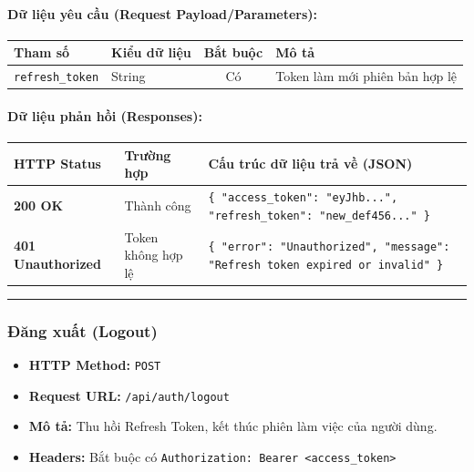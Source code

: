 \documentclass[12pt,a4paper]{article}
\begin{document}
\paragraph{Dữ liệu yêu cầu (Request Payload/Parameters):}
\begin{longtable}{|>{\raggedright\arraybackslash}p{2.8cm}|>{\raggedright\arraybackslash}p{2.2cm}|c|>{\raggedright\arraybackslash}p{7.0cm}|}
\hline
\textbf{Tham số} & \textbf{Kiểu dữ liệu} & \textbf{Bắt buộc} & \textbf{Mô tả} \\ \hline
\endhead
\texttt{refresh\_token} & String & Có & Token làm mới phiên bản hợp lệ \\ \hline
\end{longtable}

\paragraph{Dữ liệu phản hồi (Responses):}
\begin{longtable}{|>{\raggedright\arraybackslash}p{2.8cm}|>{\raggedright\arraybackslash}p{3.2cm}|>{\raggedright\arraybackslash}p{8.0cm}|}
\hline
\textbf{HTTP Status} & \textbf{Trường hợp} & \textbf{Cấu trúc dữ liệu trả về (JSON)} \\ \hline
\endhead
\textbf{200 OK} & Thành công & \texttt{\{ "access\_token": "eyJhb...", "refresh\_token": "new\_def456..." \}} \\ \hline
\textbf{401 Unauthorized} & Token không hợp lệ & \texttt{\{ "error": "Unauthorized", "message": "Refresh token expired or invalid" \}} \\ \hline
\end{longtable}

\vskip 0.4cm
\noindent\rule{\textwidth}{0.3pt}
\vskip 0.4cm

\subsubsection{Đăng xuất (Logout)}
\begin{itemize}[leftmargin=*]
    \item \textbf{HTTP Method:} \texttt{POST}
    \item \textbf{Request URL:} \texttt{/api/auth/logout}
    \item \textbf{Mô tả:} Thu hồi Refresh Token, kết thúc phiên làm việc của người dùng.
    \item \textbf{Headers:} Bắt buộc có \texttt{Authorization: Bearer \textless{}access\_token\textgreater{}}
\end{itemize}
\end{document}
